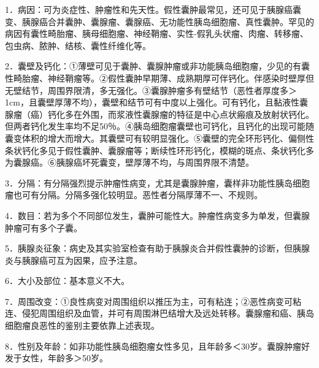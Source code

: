 1．病因：可为炎症性、肿瘤性和先天性。假性囊肿最常见，还可见于胰腺癌囊变、胰腺癌合并囊肿、囊腺瘤、囊腺癌、无功能性胰岛细胞瘤、真性囊肿。罕见的病因有囊性畸胎瘤、胰母细胞瘤、神经鞘瘤、实性-假乳头状瘤、肉瘤、转移瘤、包虫病、脓肿、结核、囊性纤维化等。

2．囊壁及钙化：①薄壁可见于囊肿、囊腺肿瘤或非功能胰岛细胞瘤，少见的有囊性畸胎瘤、神经鞘瘤等。②假性囊肿早期薄、成熟期厚可伴钙化。伴感染时壁厚但无壁结节，周围界限清，多无强化。③囊腺肿瘤多有壁结节（恶性者厚度多＞1cm，且囊壁厚薄不均），囊壁和结节可有中度以上强化。可有钙化，且黏液性囊腺瘤（癌）钙化多在外围，而浆液性囊腺瘤的特征是中心点状瘢痕及放射状钙化。但两者钙化发生率均不足50％。④胰岛细胞瘤囊壁也可钙化，且钙化的出现可能随囊变体积的增大而增大。其囊壁可有较明显强化。⑤囊壁的完全环形钙化、偏侧性条状钙化多见于假性囊肿、囊腺瘤等；断续性环形钙化，模糊的斑点、条状钙化多为囊腺癌。⑥胰腺癌坏死囊变，壁厚薄不均，与周围界限不清楚。

3．分隔：有分隔强烈提示肿瘤性病变，尤其是囊腺肿瘤，囊样非功能性胰岛细胞瘤也可有分隔。分隔多强化较明显。恶性者分隔厚薄不一、不规则。

4．数目：若为多个不同部位发生，囊肿可能性大。肿瘤性病变多为单发，但囊腺肿瘤可有多个子囊。

5．胰腺炎征象：病史及其实验室检查有助于胰腺炎合并假性囊肿的诊断，但胰腺炎与胰腺癌可互为因果，应予注意。

6．大小及部位：基本意义不大。

7．周围改变：①良性病变对周围组织以推压为主，可有粘连；②恶性病变可粘连、侵犯周围组织及血管，并可有周围淋巴结增大及远处转移。囊腺瘤和癌、胰岛细胞瘤良恶性的鉴别主要依靠上述表现。

8．性别及年龄：如非功能性胰岛细胞瘤女性多见，且年龄多＜30岁。囊腺肿瘤好发于女性，年龄多＞50岁。

\protect\hypertarget{text00021.html}{}{}

